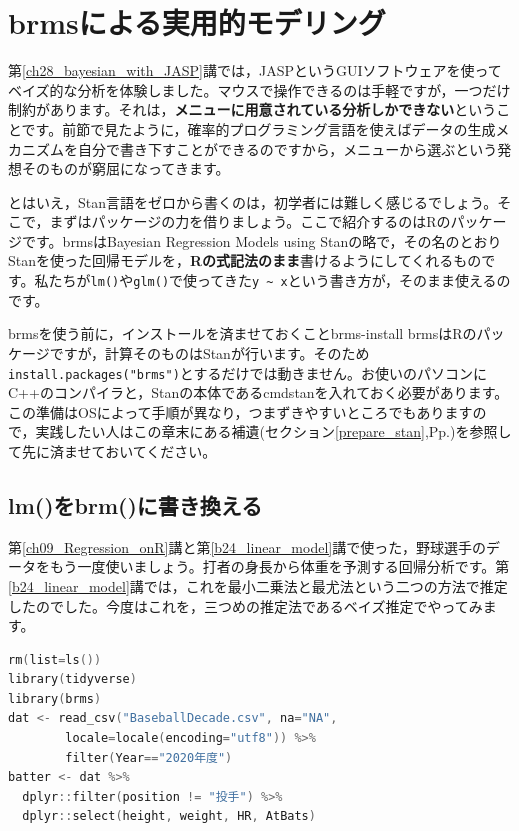 \documentclass{ltjbook}
\begin{document}
\section{brmsによる実用的モデリング}

第\ref{ch28_bayesian_with_JASP}講では，JASPというGUIソフトウェアを使ってベイズ的な分析を体験しました。マウスで操作できるのは手軽ですが，一つだけ制約があります。それは，\textbf{メニューに用意されている分析しかできない}ということです。前節で見たように，確率的プログラミング言語を使えばデータの生成メカニズムを自分で書き下すことができるのですから，メニューから選ぶという発想そのものが窮屈になってきます。

とはいえ，Stan言語をゼロから書くのは，初学者には難しく感じるでしょう。そこで，まずはパッケージの力を借りましょう。ここで紹介するのはRのパッケージ\parencite{brmsCite1}です。brmsはBayesian Regression Models using Stanの略で，その名のとおりStanを使った回帰モデルを，\textbf{Rの式記法のまま}書けるようにしてくれるものです。私たちが\verb|lm()|や\verb|glm()|で使ってきた\verb|y ~ x|という書き方が，そのまま使えるのです。

\begin{caution}{brmsを使う前に，インストールを済ませておくこと}{brms-install}
brmsはRのパッケージですが，計算そのものはStanが行います。そのため\verb|install.packages("brms")|とするだけでは動きません。お使いのパソコンにC++のコンパイラと，Stanの本体であるcmdstanを入れておく必要があります。この準備はOSによって手順が異なり，つまずきやすいところでもありますので，実践したい人はこの章末にある補遺(セクション\ref{prepare_stan},Pp.\pageref{prepare_stan})を参照して先に済ませておいてください。
\end{caution}


\subsection{lm()をbrm()に書き換える}

第\ref{ch09_Regression_onR}講と第\ref{b24_linear_model}講で使った，野球選手のデータをもう一度使いましょう。打者の身長から体重を予測する回帰分析です。第\ref{b24_linear_model}講では，これを最小二乗法と最尤法という二つの方法で推定したのでした。今度はこれを，三つめの推定法であるベイズ推定でやってみます。

\begin{lstlisting}[language=c++,label={code:29_01},caption={データの準備とパッケージの読み込み}]
rm(list=ls())
library(tidyverse)
library(brms)
dat <- read_csv("BaseballDecade.csv", na="NA",
        locale=locale(encoding="utf8")) %>%
        filter(Year=="2020年度")
batter <- dat %>%
  dplyr::filter(position != "投手") %>%
  dplyr::select(height, weight, HR, AtBats)
\end{lstlisting}
\end{document}
